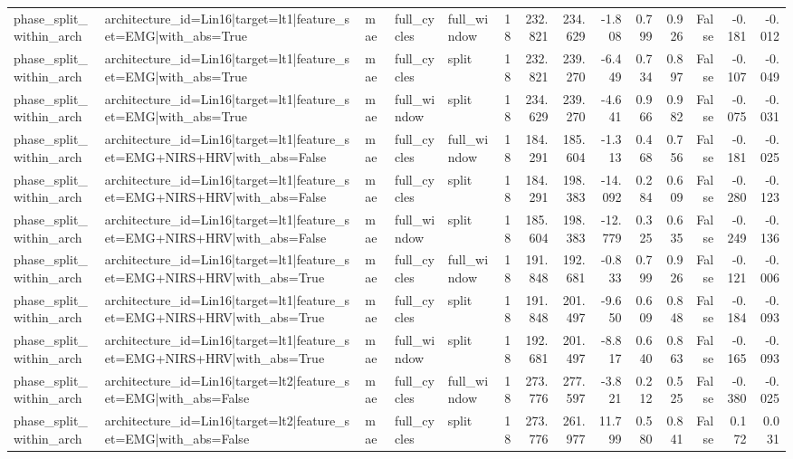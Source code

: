 \begin{table}
\begin{tabular}{lllllrrrrrrrrr}
phase_split_within_arch & architecture_id=Lin16|target=lt1|feature_set=EMG|with_abs=True & mae & full_cycles & full_window & 18 & 232.821 & 234.629 & -1.808 & 0.799 & 0.926 & False & -0.181 & -0.012 \\
phase_split_within_arch & architecture_id=Lin16|target=lt1|feature_set=EMG|with_abs=True & mae & full_cycles & split & 18 & 232.821 & 239.270 & -6.449 & 0.734 & 0.897 & False & -0.107 & -0.049 \\
phase_split_within_arch & architecture_id=Lin16|target=lt1|feature_set=EMG|with_abs=True & mae & full_window & split & 18 & 234.629 & 239.270 & -4.641 & 0.966 & 0.982 & False & -0.075 & -0.031 \\
phase_split_within_arch & architecture_id=Lin16|target=lt1|feature_set=EMG+NIRS+HRV|with_abs=False & mae & full_cycles & full_window & 18 & 184.291 & 185.604 & -1.313 & 0.468 & 0.756 & False & -0.181 & -0.025 \\
phase_split_within_arch & architecture_id=Lin16|target=lt1|feature_set=EMG+NIRS+HRV|with_abs=False & mae & full_cycles & split & 18 & 184.291 & 198.383 & -14.092 & 0.284 & 0.609 & False & -0.280 & -0.123 \\
phase_split_within_arch & architecture_id=Lin16|target=lt1|feature_set=EMG+NIRS+HRV|with_abs=False & mae & full_window & split & 18 & 185.604 & 198.383 & -12.779 & 0.325 & 0.635 & False & -0.249 & -0.136 \\
phase_split_within_arch & architecture_id=Lin16|target=lt1|feature_set=EMG+NIRS+HRV|with_abs=True & mae & full_cycles & full_window & 18 & 191.848 & 192.681 & -0.833 & 0.799 & 0.926 & False & -0.121 & -0.006 \\
phase_split_within_arch & architecture_id=Lin16|target=lt1|feature_set=EMG+NIRS+HRV|with_abs=True & mae & full_cycles & split & 18 & 191.848 & 201.497 & -9.650 & 0.609 & 0.848 & False & -0.184 & -0.093 \\
phase_split_within_arch & architecture_id=Lin16|target=lt1|feature_set=EMG+NIRS+HRV|with_abs=True & mae & full_window & split & 18 & 192.681 & 201.497 & -8.817 & 0.640 & 0.863 & False & -0.165 & -0.093 \\
phase_split_within_arch & architecture_id=Lin16|target=lt2|feature_set=EMG|with_abs=False & mae & full_cycles & full_window & 18 & 273.776 & 277.597 & -3.821 & 0.212 & 0.525 & False & -0.380 & -0.025 \\
phase_split_within_arch & architecture_id=Lin16|target=lt2|feature_set=EMG|with_abs=False & mae & full_cycles & split & 18 & 273.776 & 261.977 & 11.799 & 0.580 & 0.841 & False & 0.172 & 0.031 \\

\end{tabular}
\end{table}
